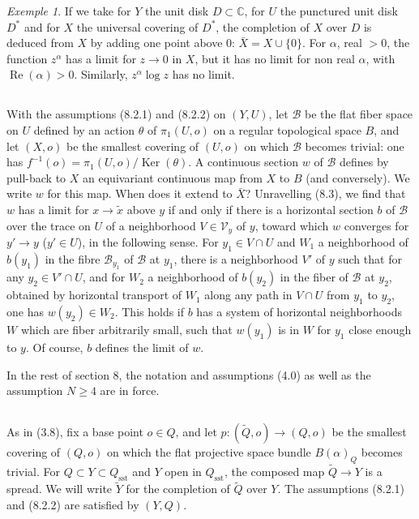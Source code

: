 \documentclass[12pt,a4paper]{article}
\theoremstyle{plain}
\theoremstyle{definition}
\theoremstyle{remark}
\newtheorem{example}[theorem]{Exemple}
\newcommand{\CC}{\mathbb{C}}
\numberwithin{equation}{section}
\providecommand{\CC}{\mathbb{C}}
\providecommand{\Ker}{\operatorname{Ker}}
\providecommand{\re}{\operatorname{Re}}
\begin{document}
\begin{example}\label{ex:8.4}
If we take for $Y$ the unit disk $D \subset \CC$, for $U$ the punctured unit disk $D^*$ and for $X$ the universal covering of $D^*$, the completion of $X$ over $D$ is deduced from $X$ by adding one point above $0$: $\bar{X} = X \cup \{0\}$. For $\alpha$, real $> 0$, the function $z^\alpha$ has a limit for $z \to 0$ in $X$, but it has no limit for non real $\alpha$, with $\re(\alpha) > 0$. Similarly, $z^\alpha \log z$ has no limit.
\end{example}

\subsection{}
With the assumptions (8.2.1) and (8.2.2) on $(Y, U)$, let $\mathscr{B}$ be the flat fiber space on $U$ defined by an action $\theta$ of $\pi_1(U, o)$ on a regular topological space $B$, and let $(X, o)$ be the smallest covering of $(U, o)$ on which $\mathscr{B}$ becomes trivial: one has $f^{-1}(o) = \pi_1(U, o)/\Ker(\theta)$. A continuous section $w$ of $\mathscr{B}$ defines by pull-back to $X$ an equivariant continuous map from $X$ to $B$ (and conversely). We write $w$ for this map. When does it extend to $\bar{X}$? Unravelling (8.3), we find that $w$ has a limit for $x \to \tilde{x}$ above $y$ if and only if there is a horizontal section $b$ of $\mathscr{B}$ over the trace on $U$ of a neighborhood $V \in \mathscr{V}_y$ of $y$, toward which $w$ converges for $y' \to y$ ($y' \in U$), in the following sense. For $y_1 \in V \cap U$ and $W_1$ a neighborhood of $b(y_1)$ in the fibre $\mathscr{B}_{y_1}$ of $\mathscr{B}$ at $y_1$, there is a neighborhood $V'$ of $y$ such that for any $y_2 \in V' \cap U$, and for $W_2$ a neighborhood of $b(y_2)$ in the fiber of $\mathscr{B}$ at $y_2$, obtained by horizontal transport of $W_1$ along any path in $V \cap U$ from $y_1$ to $y_2$, one has $w(y_2) \in W_2$. This holds if $b$ has a system of horizontal neighborhoods $W$ which are fiber arbitrarily small, such that $w(y_1)$ is in $W$ for $y_1$ close enough to $y$. Of course, $b$ defines the limit of $w$.

In the rest of section 8, the notation and assumptions (4.0) as well as the assumption $N \geq 4$ are in force.

\subsection{}
As in (3.8), fix a base point $o \in Q$, and let $p: (\widetilde{Q}, o) \to (Q, o)$ be the smallest covering of $(Q, o)$ on which the flat projective space bundle $B(\alpha)_Q$ becomes trivial. For $Q \subset Y \subset Q_{\mathrm{sst}}$ and $Y$ open in $Q_{\mathrm{sst}}$, the composed map $\widetilde{Q} \to Y$ is a spread. We will write $\widetilde{Y}$ for the completion of $\widetilde{Q}$ over $Y$. The assumptions (8.2.1) and (8.2.2) are satisfied by $(Y, Q)$.
\end{document}

